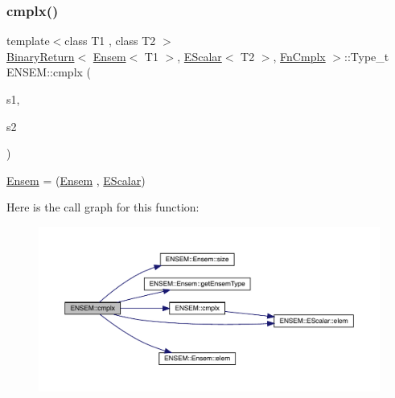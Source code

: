 \subsubsection{\texorpdfstring{cmplx()}{cmplx()}\hspace{0.1cm}{\footnotesize\ttfamily [2/3]}}
{\footnotesize\ttfamily template$<$class T1 , class T2 $>$ \\
\mbox{\hyperlink{structENSEM_1_1BinaryReturn}{Binary\+Return}}$<$ \mbox{\hyperlink{classENSEM_1_1Ensem}{Ensem}}$<$ T1 $>$, \mbox{\hyperlink{classENSEM_1_1EScalar}{E\+Scalar}}$<$ T2 $>$, \mbox{\hyperlink{structENSEM_1_1FnCmplx}{Fn\+Cmplx}} $>$\+::Type\+\_\+t E\+N\+S\+E\+M\+::cmplx (\begin{DoxyParamCaption}\item[{const \mbox{\hyperlink{classENSEM_1_1Ensem}{Ensem}}$<$ T1 $>$ \&}]{s1,  }\item[{const \mbox{\hyperlink{classENSEM_1_1EScalar}{E\+Scalar}}$<$ T2 $>$ \&}]{s2 }\end{DoxyParamCaption})\hspace{0.3cm}{\ttfamily [inline]}}



\mbox{\hyperlink{classENSEM_1_1Ensem}{Ensem}} = (\mbox{\hyperlink{classENSEM_1_1Ensem}{Ensem}} , \mbox{\hyperlink{classENSEM_1_1EScalar}{E\+Scalar}}) 

Here is the call graph for this function\+:\nopagebreak
\begin{figure}[H]
\begin{center}
\leavevmode
\includegraphics[width=350pt]{d1/d9e/group__eensem_gadd471503e7ac8d60fb8a955e1999f6fa_cgraph}
\end{center}
\end{figure}
\mbox{\label{group__eensem_gae141b1babc25cfea8bcda2218aea5125}} 
